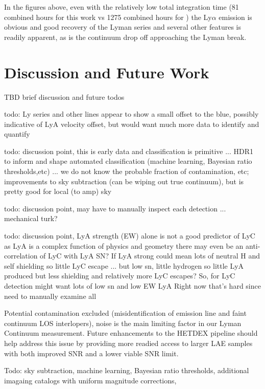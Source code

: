 \documentclass{aastex62}
\begin{document}
In the figures above, even with the relatively low total integration time (81 combined hours for this work vs 1275 combined hours for \cite{Steidel}) the Ly$\alpha$ emission is obvious and good recovery of the Lyman series and several other features is readily apparent, as is the continuum drop off approaching the Lyman break.

\section{Discussion and Future Work} \label{sec:discussion}
TBD brief discussion and future todos

{ \color{red} todo: Ly series and other lines appear to show a small offset to the blue, possibly indicative of LyA velocity offset, but would want much more data to identify and quantify}

{ \color{red} todo: discussion point, this is early data and classification is primitive ... HDR1 to inform and shape automated classification (machine learning, Bayesian ratio thresholds,etc) ... we do not know the probable fraction of contamination, etc; improvements to sky subtraction (can be wiping out true continuum), but is pretty good for local (to amp) sky}

{ \color{red} todo: discussion point, may have to manually inspect each detection ... mechanical turk?}

{ \color{red} todo: discussion point, LyA strength (EW) alone is not a good predictor of LyC as LyA is a complex function of physics and geometry there may even be an anti-correlation of LyC with LyA SN? If LyA strong could mean lots of neutral H and self shielding so little LyC escape ... but low sn, little hydrogen so little LyA produced but less shielding and relatively more LyC escapes?  So, for LyC detection might want lots of low sn and low EW LyA
Right now that's hard since need to manually examine all }

Potential contamination excluded (misidentification of emission line and faint continuum LOS interlopers), noise is the main limiting factor in our Lyman Continuum measurement. Future enhancements to the HETDEX pipeline should help address this issue by providing more readied access to larger LAE samples with both improved SNR and a lower viable SNR limit.

Todo: sky subtraction, machine learning, Bayesian ratio thresholds, additional imagaing catalogs with uniform magnitude corrections, 

\acknowledgments
\end{document}
